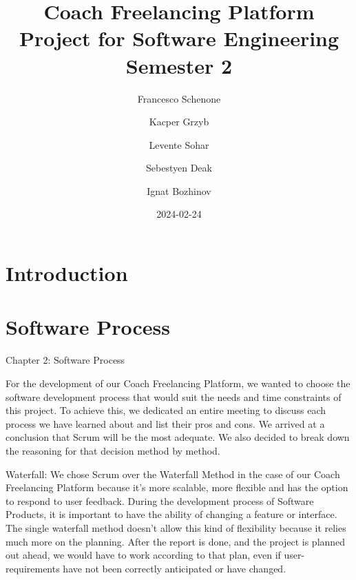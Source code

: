 \documentclass[12pt]{report}
\title{Coach Freelancing Platform Project for Software Engineering Semester 2}
\author{Francesco Schenone \and Kacper Grzyb \and Levente Sohar \and Sebestyen Deak \and Ignat Bozhinov}
\date{2024-02-24}
\begin{document}
\maketitle
\section{Introduction}
\section{Software Process}
Chapter 2: Software Process

For the development of our Coach Freelancing Platform, we wanted to choose the software development process that would suit the needs and time constraints of this project. To achieve this, we dedicated an entire meeting to discuss each process we have learned about and list their pros and cons. We arrived at a conclusion that Scrum will be the most adequate. We also decided to break down the reasoning for that decision method by method.

Waterfall:
We chose Scrum over the Waterfall Method in the case of our Coach Freelancing Platform because it’s more scalable, more flexible and has the option to respond to user feedback. During the development process of Software Products, it is important to have the ability of changing a feature or interface. The single waterfall method doesn’t allow this kind of flexibility because it relies much more on the planning. After the report is done, and the project is planned out ahead, we would have to work according to that plan, even if user-requirements have not been correctly anticipated or have changed. 
\end{document}
